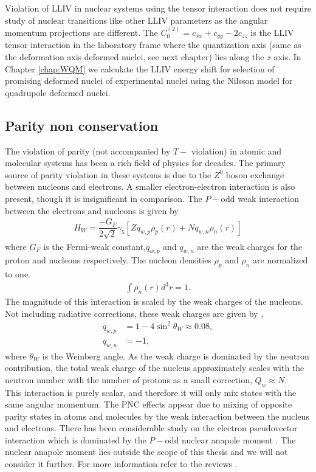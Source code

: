 \documentclass[10pt,a4paper, twoside, openright]{report}
\begin{document}
 \linebreak
Violation of LLIV in nuclear systems using the tensor interaction does not require study of nuclear transitions like other LLIV parameters as the angular momentum projections are different. The $C_0^{(2)} = c_{xx} + c_{yy} - 2c_{zz}$ is the LLIV tensor interaction in the laboratory frame where the quantization axis (same as the deformation axis deformed nuclei, see next chapter) lies along the $z$ axis. In Chapter \ref{chap:WQM} we calculate the LLIV energy shift for selection of promising deformed nuclei of experimental nuclei using the Nilsson model for quadrupole deformed nuclei. 
\subsection{Parity non conservation}
The violation of parity (not accompanied by $T-$ violation) in atomic and molecular systems has been a rich field of physics for decades. The primary source of parity violation in these systems is due to the $Z^0$ boson exchange between nucleons and electrons. A smaller electron-electron interaction is also present, though it is insignificant in comparison. The $P-$odd weak interaction between the electrons and nucleons is given by
\begin{align*}
H_W = \dfrac{-G_F}{2\sqrt{2}} \gamma_5 \left[Zq_{w,p}\rho_{p}\left(r\right) + Nq_{w,n}\rho_{n}\left(r\right)\right]
\end{align*}
where $G_F$ is the Fermi-weak constant,$q_{w,p} $ and $q_{w,n} $ are the weak charges for the proton and nucleons respectively. The nucleon densities $\rho_p$ and $\rho_n$ are normalized to one. 
\begin{align*}
\int \rho_{n}\left(r\right) d^3r = 1.
\end{align*}
The magnitude of this interaction is scaled by the weak charges of the nucleons. Not including radiative corrections, these weak charges are given by \cite{KhriplovichPNC},
\begin{align*}
q_{w,p} &= 1 - 4\sin^2\theta_W \approx 0.08 ,\\
q_{w,n} &= -1,
\end{align*}
where $\theta_W$ is the Weinberg angle. As the weak charge is dominated by the neutron contribution, the total weak charge of the nucleus approximately scales with the neutron number with the number of protons as a small correction, $Q_{w} \approx N$.\\
\linebreak
This interaction is purely scalar, and therefore it will only mix states with the same angular momentum. The PNC effects appear due to mixing of opposite parity states in atoms and molecules by the weak interaction between the nucleus and electrons. There has been considerable study on the electron pseudovector interaction which is dominated by the $P-$odd nuclear anapole moment \cite{GingesReview}. The nuclear anapole moment lies outside the scope of this thesis and we will not consider it further. For more information refer to the reviews \cite{GingesReview, Roberts2015, KhriplovichPNC}. \\
\end{document}
